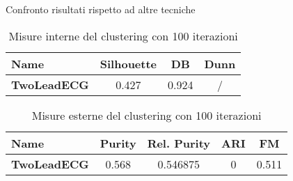 Confronto risultati rispetto ad altre tecniche

\begin{table}[H]
	\centering
	\begin{tabularx}{\textwidth}{X c c c}
		\hline
		\textbf{Name} & \textbf{Silhouette} & \textbf{DB} & \textbf{Dunn} \\
		\hline
		\textbf{TwoLeadECG} & 0.427 & 0.924 & / \\
	\end{tabularx}
	\caption{Misure interne del clustering con 100 iterazioni}
	\label{tab:clustering100_int}
\end{table}

\begin{table}[H]
	\centering
	\begin{tabularx}{\textwidth}{X c c c c}
		\hline
		\textbf{Name} & \textbf{Purity} & \textbf{Rel. Purity} & \textbf{ARI} & \textbf{FM}\\
		\hline
		\textbf{TwoLeadECG} & 0.568 & 0.546875 & 0 & 0.511 \\
	\end{tabularx}
	\caption{Misure esterne del clustering con 100 iterazioni}
	\label{tab:clustering100_ext}
\end{table}